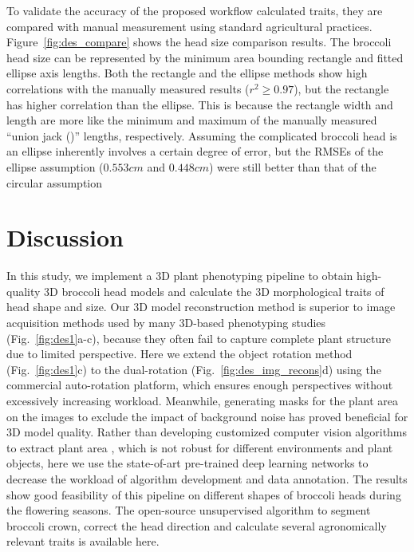 To validate the accuracy of the proposed workflow calculated traits, they are compared with manual measurement using standard agricultural practices. Figure~\ref{fig:des_compare} shows the head size comparison results. The broccoli head size can be represented by the minimum area bounding rectangle and fitted ellipse axis lengths. Both the rectangle and the ellipse methods show high correlations with the manually measured results ($r^2\geq0.97$), but the rectangle has higher correlation than the ellipse. This is because the rectangle width and length are more like the minimum and maximum of the manually measured ``union jack ()'' lengths, respectively. Assuming the complicated broccoli head is an ellipse inherently involves a certain degree of error, but the RMSEs of the ellipse assumption ($0.553 cm$ and $0.448 cm$) were still better than that of the circular assumption \citep[Table 5, RMSE$=0.97 cm$]{blok_image_2021}



\section{Discussion}

In this study, we implement a 3D plant phenotyping pipeline to obtain high-quality 3D broccoli head models and calculate the 3D morphological traits of head shape and size. Our 3D model reconstruction method is superior to image acquisition methods used by many 3D-based phenotyping studies (Fig.~\ref{fig:des1}a-c), because they often fail to capture complete plant structure due to limited perspective. Here we extend the object rotation method (Fig.~\ref{fig:des1}c) to the dual-rotation (Fig.~\ref{fig:des_img_recons}d) using the commercial auto-rotation platform, which ensures enough perspectives without excessively increasing workload. Meanwhile, generating masks for the plant area on the images to exclude the impact of background noise has proved beneficial for 3D model quality. Rather than developing customized computer vision algorithms to extract plant area \citep{nguyen_3d_2016,kochi_3d_2018,kochi_all_2022}, which is not robust for different environments and plant objects, here we use the state-of-art pre-trained deep learning networks to decrease the workload of algorithm development and data annotation. The results show good feasibility of this pipeline on different shapes of broccoli heads during the flowering seasons. The open-source unsupervised algorithm to segment broccoli crown, correct the head direction and calculate several agronomically relevant traits is available here. 

